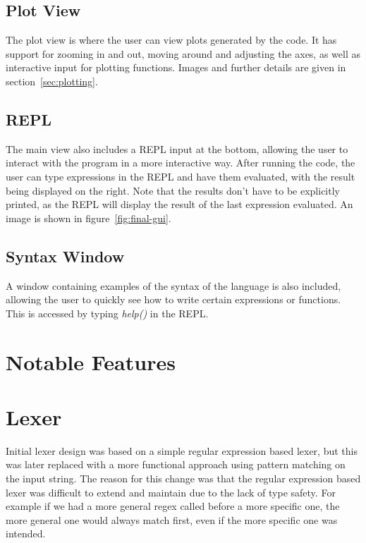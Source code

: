 \subsection{Plot View}\label{subsec:plot-view}

The plot view is where the user can view plots generated by the code.
It has support for zooming in and out, moving around and adjusting the axes, as well as interactive input for
plotting functions.
Images and further details are given in section~\ref{sec:plotting}.

\subsection{REPL}\label{subsec:repl}

The main view also includes a REPL input at the bottom, allowing the user to interact with the program in a more
interactive way.
After running the code, the user can type expressions in the REPL and have them evaluated, with the result being
displayed on the right.
Note that the results don't have to be explicitly printed, as the REPL will display the result of the last expression
evaluated.
An image is shown in figure~\ref{fig:final-gui}.

\subsection{Syntax Window}\label{subsec:syntax-window}

A window containing examples of the syntax of the language is also included, allowing the user to quickly see how to
write certain expressions or functions.
This is accessed by typing \textit{help()} in the REPL\@.

\section{Notable Features}\label{sec:notable-features}



\section{Lexer}\label{sec:lexer}

Initial lexer design was based on a simple regular expression based lexer, but this was later replaced with a more
functional approach using pattern matching on the input string.
The reason for this change was that the regular expression based lexer was difficult to extend and maintain due to 
the lack of type safety.
For example if we had a more general regex called before a more specific one, the more general one would always match
first, even if the more specific one was intended.

